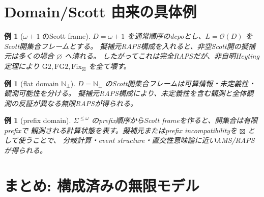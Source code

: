 \documentclass[uplatex,dvipdfmx,a4paper,10pt]{jsarticle}
\newtheorem{example}[theorem]{例}
\newcommand{\Gtwo}{\mathrm{G2}}
\newcommand{\FGtwo}{\mathrm{FG2}}
\newcommand{\Fix}{\mathrm{Fix}}
\newcommand{\bt}{\boxtimes}
\begin{document}
\section{Domain/Scott 由来の具体例}

\begin{example}[\(\omega+1\) のScott frame]
\(D=\omega+1\) を通常順序のdcpoとし、\(L=\mathcal O(D)\) をScott開集合フレームとする。
擬補元RAPS構成を入れると、非空Scott開の擬補元は多くの場合 \(\varnothing\) へ潰れる。
したがってこれは完全RAPSだが、非自明Heyting定理により \(\Gtwo,\FGtwo,\Fix_{\bt}\)
を全て壊す。
\end{example}

\begin{example}[flat domain \(\mathbb N_\bot\)]
\(D=\mathbb N_\bot\) のScott開集合フレームは可算情報・未定義性・観測可能性を分ける。
擬補元RAPS構成により、未定義性を含む観測と全体観測の反証が異なる無限RAPSが得られる。
\end{example}

\begin{example}[prefix domain]
\(\Sigma^{\le\omega}\) のprefix順序からScott frameを作ると、開集合は有限prefixで
観測される計算状態を表す。擬補元またはprefix incompatibilityを \(\bt\) として使うことで、
分岐計算・event structure・直交性意味論に近いAMS/RAPSが得られる。
\end{example}

\section{まとめ: 構成済みの無限モデル}
\end{document}
